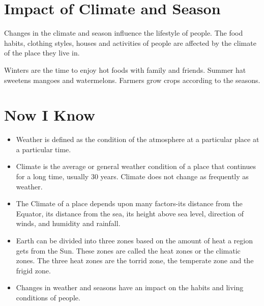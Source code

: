\section{Impact of Climate and Season}
Changes in the climate and season influence the lifestyle of people. The food habits, clothing styles, houses and activities of people are affected by the climate of the place they live in.
\vspace{0.1in}
\par
Winters are the time to enjoy hot foods with family and friends. Summer hat sweetens mangoes and watermelons. Farmers grow crops according to the seasons.
\vspace{5.6in}
\section{Now I Know}
\begin{itemize}
    \item Weather is defined as the condition of the atmosphere at a particular place at a particular time.
    \item Climate is the average or general weather condition of a place that continues for a long time, usually 30 years. Climate does not change as frequently as weather.
    \item The Climate of a place depends upon many factors-its distance from the Equator, its distance from the sea, its height above sea level, direction of winds, and humidity and rainfall.
    \item Earth can be divided into three zones based on the amount of heat a region gets from the Sun. These zones are called the heat zones or the climatic zones. The three heat zones are the torrid zone, the temperate zone and the frigid zone.
    \item Changes in weather and seasons have an impact on the habits and living conditions of people.
\end{itemize}